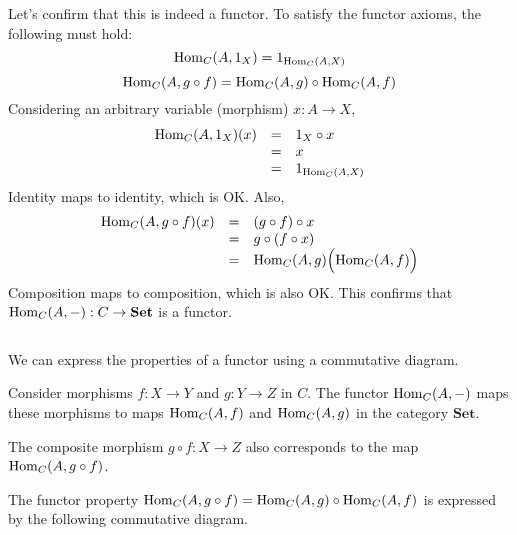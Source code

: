 \documentclass[uplatex,a4j,12pt,dvipdfmx]{jsarticle}
\begin{document}
Let's confirm that this is indeed a functor.
To satisfy the functor axioms, the following must hold:
\[
	{\rm Hom}_{C}(A,1_{X}) = 1_{{\rm Hom}_{C} (A,X)}
\]
\[
	{\rm Hom}_{C}(A,g \circ f) = {\rm Hom}_{C} (A,g) \circ {\rm Hom}_{C} (A,f)
\]
Considering an arbitrary variable (morphism)
$x: A \to X$,
\[
	\begin{array}{rcl}
		{\rm Hom}_{C}(A,1_{X})(x) & = & 1_{X} \circ x          \\
		                         & = & x                      \\
		                         & = & 1_{{\rm Hom}_{C} (A,X)}
	\end{array}
\]
Identity maps to identity, which is OK. Also,
\[
	\begin{array}{rcl}
		{\rm Hom}_{C}(A,g \circ f)(x) & = & (g \circ f) \circ x                      \\
		                             & = & g \circ (f \circ x)                      \\
		                             & = & {\rm Hom}_{C}(A,g) \Big( {\rm Hom}_{C}(A,f) \Big)
	\end{array}
\]
Composition maps to composition, which is also OK. This confirms that
${\rm Hom}_{C}(A,-) : C \to \mathbf{Set}$
is a functor.

${}$

We can express the properties of a functor using a commutative diagram.

Consider morphisms $f: X \to Y$ and $g: Y \to Z$ in $C$.
The functor ${\rm Hom}_{C}(A,-)$ maps these morphisms to maps ${\rm Hom}_{C}(A,f)$ and ${\rm Hom}_{C}(A,g)$ in the category $\mathbf{Set}$.

The composite morphism
$g \circ f: X \to Z$
also corresponds to the map ${\rm Hom}_{C}(A,g \circ f)$.

The functor property
${\rm Hom}_{C}(A,g \circ f) = {\rm Hom}_{C} (A,g) \circ {\rm Hom}_{C}(A,f)$
is expressed by the following commutative diagram.
\end{document}
